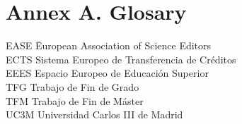 \documentclass[12pt]{report} %
\begin{document}
\clearpage
{}

\printbibliography




\chapter* {Annex A. Glosary}

\begin{tabbing}	
EASE \quad\=	European Association of Science Editors \\
ECTS \>	Sistema Europeo de Transferencia de Créditos \\
EEES \> Espacio Europeo de Educación Superior \\
TFG	\>	Trabajo de Fin de Grado \\
TFM	\>	Trabajo de Fin de Máster \\
UC3M \>	Universidad Carlos III de Madrid 
\end{tabbing}
\end{document}
